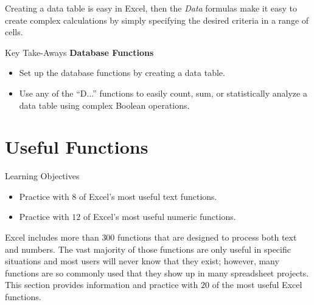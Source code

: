Creating a data table is easy in Excel, then the \textit{Data} formulas make it easy to create complex calculations by simply specifying the desired criteria in a range of cells.
	
\begin{center}
	\begin{tkwbox}{Key Take-Aways}
		\textbf{Database Functions}
		\\
		\begin{itemize}
			\setlength{\itemsep}{0pt}
			\setlength{\parskip}{0pt}
			\setlength{\parsep}{0pt}
			
			\item Set up the database functions by creating a data table.
			\item Use any of the ``D...'' functions to easily count, sum, or statistically analyze a data table using complex Boolean operations. 
			
		\end{itemize}
	\end{tkwbox}
\end{center}

\section{Useful Functions}

\begin{center}
	\begin{objbox}{Learning Objectives}
		\begin{itemize}
			\setlength{\itemsep}{0pt}
			\setlength{\parskip}{0pt}
			\setlength{\parsep}{0pt}
			
			\item Practice with $ 8 $ of Excel's most useful text functions.
			\item Practice with $ 12 $ of Excel's most useful numeric functions.
			
		\end{itemize}
	\end{objbox}
\end{center}

Excel includes more than $ 300 $ functions that are designed to process both text and numbers. The vast majority of those functions are only useful in specific situations and most users will never know that they exist; however, many functions are so commonly used that they show up in many spreadsheet projects. This section provides information and practice with $ 20 $ of the most useful Excel functions.

